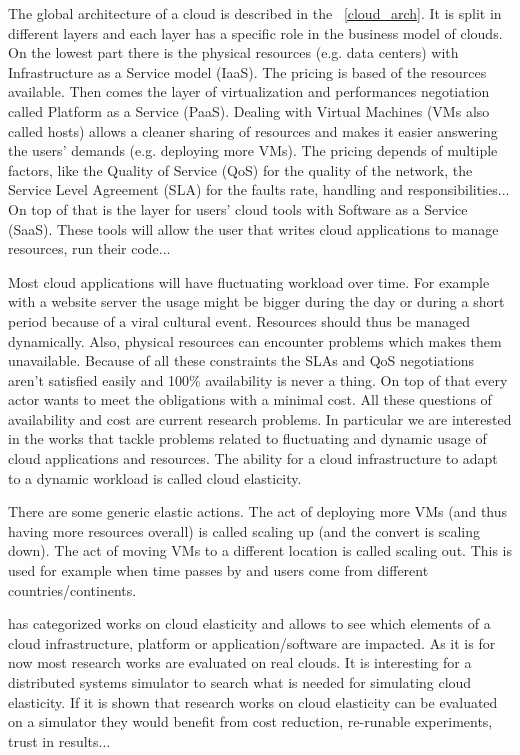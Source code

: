 \documentclass[a4paper]{IEEEtran}
\begin{document}
  The global architecture of a cloud is described in the
  \figurename~\ref{cloud_arch}. It is split in different layers and each layer
  has a specific role in the business model of clouds. On the lowest part there
  is the physical resources (e.g. data centers) with Infrastructure as a Service
  model (IaaS). The pricing is based of the resources available. Then comes the
  layer of virtualization and performances negotiation called Platform as a
  Service (PaaS). Dealing with Virtual Machines (VMs also called hosts) allows a
  cleaner sharing of resources and makes it easier answering the users' demands
  (e.g. deploying more VMs). The pricing depends of multiple factors, like the
  Quality of Service (QoS) for the quality of the network, the Service Level
  Agreement (SLA) for the faults rate, handling and responsibilities... On top
  of that is the layer for users' cloud tools with Software as a Service (SaaS).
  These tools will allow the user that writes cloud applications to manage
  resources, run their code...
  
  Most cloud applications will have fluctuating workload over time. For example 
  with a website server the usage might be bigger during the day or during a 
  short period because of a viral cultural event. Resources should thus be 
  managed dynamically. Also, physical resources can encounter problems which 
  makes them unavailable. Because of all these constraints the SLAs and QoS 
  negotiations aren't satisfied easily and 100\% availability is never a thing. 
  On top of that every actor wants to meet the obligations with a minimal cost. 
  All these questions of availability and cost are current research problems. 
  In particular we are interested in the works that tackle problems related to 
  fluctuating and dynamic usage of cloud applications and resources. The 
  ability for a cloud infrastructure to adapt to a dynamic workload is called 
  cloud elasticity.
  
  There are some generic elastic actions. The act of deploying more VMs (and
  thus having more resources overall) is called scaling up (and the convert is
  scaling down). The act of moving VMs to a different location is called scaling
  out. This is used for example when time passes by and users come from
  different countries/continents.
  
  \cite{Naskos2016} has categorized works on cloud elasticity and allows to see
  which elements of a cloud infrastructure, platform or application/software are
  impacted. As it is for now most research works are evaluated on real clouds.
  It is interesting for a distributed systems simulator to search what is needed
  for simulating cloud elasticity. If it is shown that research works on cloud
  elasticity can be evaluated on a simulator they would benefit from cost
  reduction, re-runable experiments, trust in results...
  
\end{document}
